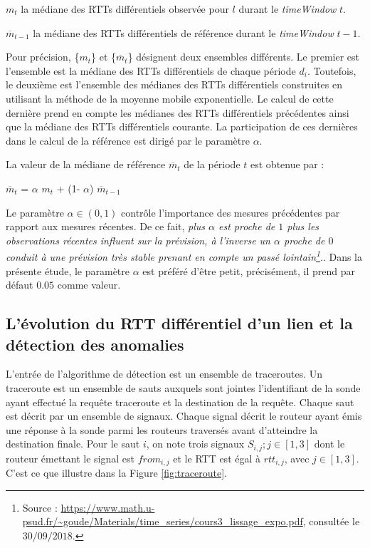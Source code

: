 $m_t$ la médiane des RTTs différentiels observée pour $l$ durant le \textit{timeWindow} $t$. 

$ \overline{m}_{t-1}$  la médiane des  RTTs différentiels  de référence durant le \textit{timeWindow} $ t-1 $.  



Pour précision, \{$m_t$\} et \{$ \overline{m}_{t}$\} désignent deux ensembles différents. Le premier est l'ensemble est la médiane des RTTs différentiels de chaque période $d_i$. Toutefois, le deuxième est l'ensemble des médianes des RTTs différentiels construites en utilisant la méthode de la moyenne mobile exponentielle. Le calcul de cette dernière prend en compte les médianes des RTTs différentiels précédentes ainsi que la médiane des RTTs différentiels courante. La participation de ces dernières dans le calcul de la référence est dirigé par le paramètre $\alpha$.

La  valeur de la médiane de référence  $ \overline{m}_{t}$ de la période $t$ est obtenue par : 

\begin{center}
	$ \overline{m}_{t}$ =  $\alpha$ ${m}_{t}$ + (1-  $\alpha$) $ \overline{m}_{t-1}$
\end{center}

Le paramètre  $\alpha \in (0, 1)$  contrôle l'importance  des mesures précédentes par rapport aux mesures récentes. De ce fait, \guillemotleft \textit{plus $\alpha$ est proche de $ 1 $ plus les observations récentes influent sur la prévision, à l'inverse un $\alpha$ proche de $0$ conduit à une prévision très stable prenant en compte un passé lointain\footnote{Source : \url{https://www.math.u-psud.fr/~goude/Materials/time_series/cours3_lissage_expo.pdf}, consultée le $30/09/2018$.}}.\guillemotright.  Dans la présente étude, le paramètre $\alpha$ est préféré d'être petit, précisément, il prend par défaut $0.05$ comme valeur.

\subsection{L'évolution du RTT différentiel d'un lien et  la détection des anomalies} \label{rttevolution}


L'entrée de l'algorithme de détection est un ensemble de traceroutes. Un traceroute  est un ensemble de sauts auxquels sont jointes l'identifiant de la sonde ayant effectué la requête traceroute et la destination de la requête. Chaque saut est décrit par un ensemble de signaux.  Chaque signal décrit le routeur ayant émis une réponse à la sonde parmi les routeurs traversés avant d'atteindre la destination finale.  Pour le saut $i$, on note trois signaux $S_{i, j}; j\in [1,3]$ dont le routeur émettant le signal est $from_{i,j}$ et le RTT est égal à $rtt_{i,j}$, avec $j \in [1,3]$. C'est ce que   illustre dans la Figure \ref{fig:traceroute}.

